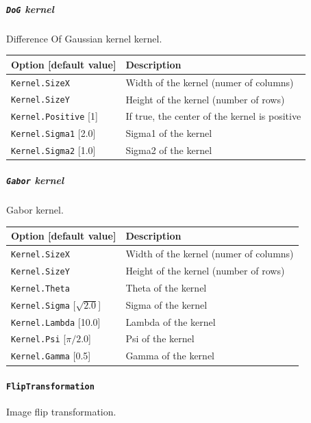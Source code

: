 \documentclass[a4paper,11pt,oneside]{article}
\begin{document}
\subparagraph{\texorpdfstring{%
\lstinline[basicstyle=\ttfamily\bfseries]!DoG! kernel}{DoG kernel}}
Difference Of Gaussian kernel kernel.

\begin{center}
 \begin{tabular}{| m{4cm} | m{7cm} | }
 \hline
 Option [default value] & Description\\
 \hline\hline
  \cellcolor{requiredcolor}\lstinline!Kernel.SizeX! & Width of the kernel
  (numer of columns)\\
  \cellcolor{requiredcolor}\lstinline!Kernel.SizeY! & Height of the kernel
   (number of rows)\\
  \lstinline!Kernel.Positive! [1] & If true, the center of the kernel is
  positive\\
  \lstinline!Kernel.Sigma1! [2.0] & Sigma1 of the kernel\\
  \lstinline!Kernel.Sigma2! [1.0] & Sigma2 of the kernel\\
 \hline
\end{tabular}
\end{center}


\subparagraph{\texorpdfstring{%
\lstinline[basicstyle=\ttfamily\bfseries]!Gabor! kernel}{Gabor kernel}}
Gabor kernel.

\begin{center}
 \begin{tabular}{| m{4cm} | m{7cm} | }
 \hline
 Option [default value] & Description\\
 \hline\hline
  \cellcolor{requiredcolor}\lstinline!Kernel.SizeX! & Width of the kernel
  (numer of columns)\\
  \cellcolor{requiredcolor}\lstinline!Kernel.SizeY! & Height of the kernel
  (number of rows)\\
  \cellcolor{requiredcolor}\lstinline!Kernel.Theta! & Theta of the kernel\\
  \lstinline!Kernel.Sigma! [$\sqrt{2.0}$] & Sigma of the kernel\\
  \lstinline!Kernel.Lambda! [10.0] & Lambda of the kernel\\
  \lstinline!Kernel.Psi! [$\pi/2.0$] & Psi of the kernel\\
  \lstinline!Kernel.Gamma! [0.5] & Gamma of the kernel\\
 \hline
\end{tabular}
\end{center}


\paragraph{\texorpdfstring{%
\lstinline[basicstyle=\ttfamily\bfseries]!FlipTransformation!}
{FlipTransformation}}
Image flip transformation.
\end{document}
